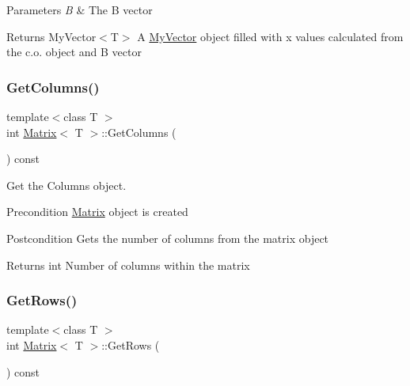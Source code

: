 \begin{DoxyParams}{Parameters}
{\em B} & The B vector \\
\hline
\end{DoxyParams}
\begin{DoxyReturn}{Returns}
My\+Vector$<$\+T$>$ A \mbox{\hyperlink{class_my_vector}{My\+Vector}} object filled with x values calculated from the c.\+o. object and B vector 
\end{DoxyReturn}
\mbox{\label{class_matrix_ada60917bb197292e0645992e108c2c2f}} 
\subsubsection{\texorpdfstring{GetColumns()}{GetColumns()}}
{\footnotesize\ttfamily template$<$class T $>$ \\
int \mbox{\hyperlink{class_matrix}{Matrix}}$<$ T $>$\+::Get\+Columns (\begin{DoxyParamCaption}{ }\end{DoxyParamCaption}) const}



Get the Columns object. 

\begin{DoxyPrecond}{Precondition}
\mbox{\hyperlink{class_matrix}{Matrix}} object is created 
\end{DoxyPrecond}
\begin{DoxyPostcond}{Postcondition}
Gets the number of columns from the matrix object 
\end{DoxyPostcond}
\begin{DoxyReturn}{Returns}
int Number of columns within the matrix 
\end{DoxyReturn}
\mbox{\label{class_matrix_aa665db4bc173a7bb4ec3f9da2676dfa6}} 
\subsubsection{\texorpdfstring{GetRows()}{GetRows()}}
{\footnotesize\ttfamily template$<$class T $>$ \\
int \mbox{\hyperlink{class_matrix}{Matrix}}$<$ T $>$\+::Get\+Rows (\begin{DoxyParamCaption}{ }\end{DoxyParamCaption}) const}



